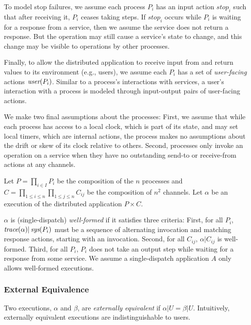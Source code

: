 To model stop failures, we assume each process $P_i$ has an input
action $\textit{stop}_i$ such that after receiving it, $P_i$ ceases taking
steps. If $\textit{stop}_i$ occurs while $P_i$ is waiting for a response from a service, then we assume the service does not return a response. But the operation may still cause a service's state to change, and this change may be visible to operations by other processes.

Finally, to allow the distributed application to receive input from and return values to its environment (e.g., users), we assume each $P_i$ has a set of \textit{user-facing} actions $\operatorname*{\textit{user}}(P_i)$. Similar to a process's interactions with services, a user's interaction with a process is modeled through input-output pairs of user-facing actions.

We make two final assumptions about the processes: First, we assume that while
each process has access to a local clock, which is part of its state, and may
set local timers, which are internal actions, the process makes no assumptions
about the drift or skew of its clock relative to others. Second, processes only
invoke an operation on a service when they have no outstanding send-to or
receive-from actions at any channels.

Let $P = \prod_{i \in I} P_i$ be the composition of the $n$ processes and
$C = \prod_{1 \leq i \leq n} \prod_{1 \leq j \leq n} C_{ij}$ be the composition of $n^2$ channels.
Let $\alpha$ be an execution of the distributed application $P \times C$.

$\alpha$ is (single-dispatch) \textit{well-formed} if it satisfies three criteria:
First, for all $P_i$, $\operatorname*{\textit{trace}}(\alpha) | \operatorname*{\textit{sys}}(P_i)$ must be a sequence of alternating invocation and matching response actions, starting with an invocation. Second, for all $C_{ij}$, $\alpha | C_{ij}$ is well-formed. Third, for all $P_i$, $P_i$ does not take an output step while waiting for a response from some service. We assume a single-dispatch application $A$ only allows well-formed executions.

\subsubsection{External Equivalence}
\label{sec:equivalence:preliminaries:equivalence}

Two executions, $\alpha$ and $\beta$, are
\textit{externally equivalent} if $\alpha|U = \beta|U$. Intuitively,
externally equivalent executions are indistinguishable to users.

